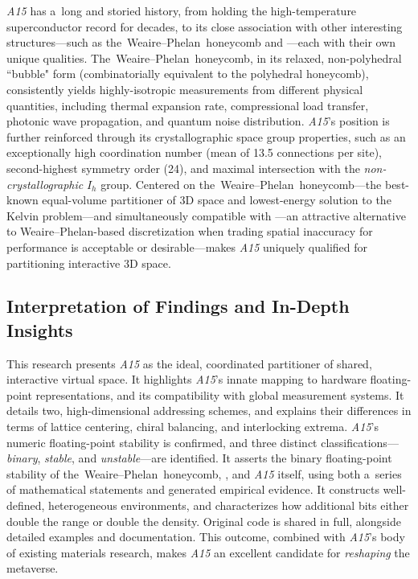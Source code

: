 \documentclass[10pt]{article}
\def\AAAB{\textit{A15}}
\def\WP{Weaire--Phelan} \def\WPH{Weaire--Phelan~Honeycomb} \def\TWPh{The~Weaire--Phelan~honeycomb}
\def\tWPh{the~Weaire--Phelan~honeycomb}
\begin{document}
\AAAB{} has a~long and storied history, from holding the high-temperature superconductor record for decades, to its close
association with other interesting structures---such as \tWPh{} and \tTSp---each with their own unique qualities. \TWPh, in its
relaxed, non-polyhedral ``bubble" form (combinatorially equivalent to the polyhedral honeycomb), consistently yields
highly-isotropic measurements from different physical quantities, including thermal expansion rate, compressional load transfer,
photonic wave propagation, and quantum noise distribution. \AAAB's position is further reinforced through its crystallographic
space group properties, such as an exceptionally high coordination number (mean of 13.5 connections per site), second-highest
symmetry order (24), and maximal intersection with the \emph{non-crystallographic} $I_h$ group. Centered on \tWPh---the
best-known equal-volume partitioner of 3D space and lowest-energy solution to the Kelvin problem---and simultaneously compatible
with \tTSp---an attractive alternative to \WP-based discretization when trading spatial inaccuracy for performance is acceptable
or desirable---makes \AAAB{} uniquely qualified for partitioning interactive 3D space.

\subsection{ Interpretation of Findings and In-Depth Insights }\label{interpretation-of-findings-and-in-depth-insights}

This research presents \AAAB{} as the ideal, coordinated partitioner of shared, interactive virtual space. It highlights \AAAB's
innate mapping to hardware floating-point representations, and its compatibility with global measurement systems. It details two,
high-dimensional addressing schemes, and explains their differences in terms of lattice centering, chiral balancing, and
interlocking extrema. \AAAB's numeric floating-point stability is confirmed, and three distinct classifications---\emph{binary},
\emph{stable}, and \emph{unstable}---are identified. It asserts the binary floating-point stability of \tWPh, \tTSp, and \AAAB{}
itself, using both a~series of mathematical statements and generated empirical evidence. It constructs well-defined,
heterogeneous environments, and characterizes how additional bits either double the range or double the density. Original code is
shared in full, alongside detailed examples and documentation. This outcome, combined with \AAAB's body of existing materials
research, makes \AAAB{} an excellent candidate for \emph{reshaping} the metaverse.
\end{document}
